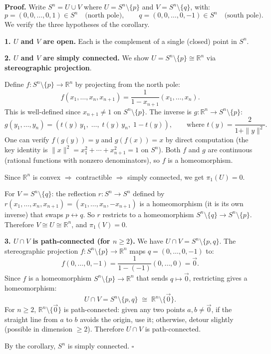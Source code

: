 \documentclass[11pt]{report}
\renewenvironment{proof}[1][Proof]{\noindent\textbf{#1.} }{\hfill$\square$\par\vspace{5pt}}
\begin{document}
\begin{proof}
Write $S^n = U \cup V$ where $U = S^n \setminus \{p\}$ and $V = S^n \setminus \{q\}$, with:
\[p = (0, 0, \ldots, 0, 1) \in S^n \quad \text{(north pole)}, \qquad q = (0, 0, \ldots, 0, -1) \in S^n \quad \text{(south pole)}.\]
We verify the three hypotheses of the corollary.

\textbf{1. $U$ and $V$ are open.} Each is the complement of a single (closed) point in $S^n$.

\textbf{2. $U$ and $V$ are simply connected.} We show $U = S^n \setminus \{p\} \cong \mathbb{R}^n$ via \textbf{stereographic projection}.

Define $f: S^n \setminus \{p\} \to \mathbb{R}^n$ by projecting from the north pole:
\[f(x_1, \ldots, x_n, x_{n+1}) = \frac{1}{1 - x_{n+1}}(x_1, \ldots, x_n).\]
This is well-defined since $x_{n+1} \neq 1$ on $S^n \setminus \{p\}$. The inverse is $g: \mathbb{R}^n \to S^n \setminus \{p\}$:
\[g(y_1, \ldots, y_n) = \left(t(y)\,y_1, \;\ldots,\; t(y)\,y_n, \;1 - t(y)\right), \qquad \text{where } t(y) = \frac{2}{1 + \|y\|^2}.\]
One can verify $f(g(y)) = y$ and $g(f(x)) = x$ by direct computation (the key identity is $\|x\|^2 = x_1^2 + \cdots + x_{n+1}^2 = 1$ on $S^n$). Both $f$ and $g$ are continuous (rational functions with nonzero denominators), so $f$ is a homeomorphism.

Since $\mathbb{R}^n$ is convex $\Rightarrow$ contractible $\Rightarrow$ simply connected, we get $\pi_1(U) = 0$.

For $V = S^n \setminus \{q\}$: the reflection $r: S^n \to S^n$ defined by $r(x_1, \ldots, x_n, x_{n+1}) = (x_1, \ldots, x_n, -x_{n+1})$ is a homeomorphism (it is its own inverse) that swaps $p \leftrightarrow q$. So $r$ restricts to a homeomorphism $S^n \setminus \{q\} \to S^n \setminus \{p\}$. Therefore $V \cong U \cong \mathbb{R}^n$, and $\pi_1(V) = 0$.

\textbf{3. $U \cap V$ is path-connected (for $n \geq 2$).} We have $U \cap V = S^n \setminus \{p, q\}$. The stereographic projection $f: S^n \setminus \{p\} \to \mathbb{R}^n$ maps $q = (0, \ldots, 0, -1)$ to:
\[f(0, \ldots, 0, -1) = \frac{1}{1 - (-1)}(0, \ldots, 0) = \vec{0}.\]
Since $f$ is a homeomorphism $S^n \setminus \{p\} \to \mathbb{R}^n$ that sends $q \mapsto \vec{0}$, restricting gives a homeomorphism:
\[U \cap V = S^n \setminus \{p, q\} \;\cong\; \mathbb{R}^n \setminus \{\vec{0}\}.\]
For $n \geq 2$, $\mathbb{R}^n \setminus \{\vec{0}\}$ is path-connected: given any two points $a, b \neq \vec{0}$, if the straight line from $a$ to $b$ avoids the origin, use it; otherwise, detour slightly (possible in dimension $\geq 2$). Therefore $U \cap V$ is path-connected.

By the corollary, $S^n$ is simply connected.
\end{proof}
\end{document}
